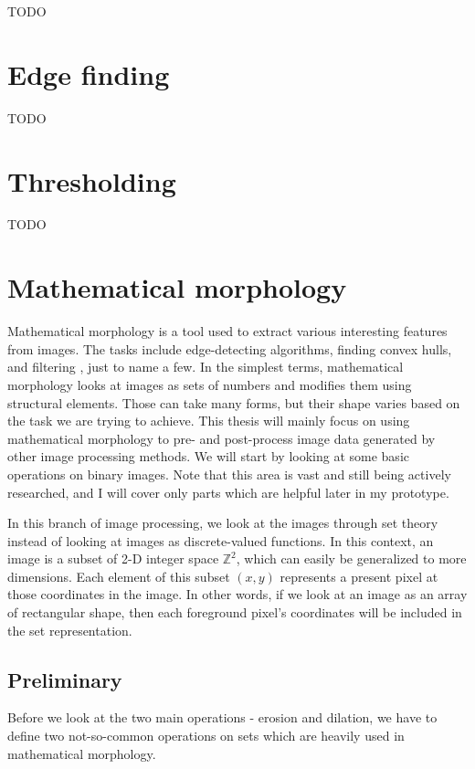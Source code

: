 \documentclass[
  digital,     %
  oneside,     %
  nosansbold,  %
  nocolorbold, %
  lof,         %
  lot,         %
]{fithesis4}
\newcommand*{\Z}{\ensuremath{\mathbb{Z}}}
\begin{document}
TODO

\section{Edge finding}
TODO

\section{Thresholding}
TODO

\section{Mathematical morphology}

Mathematical morphology is a tool used to extract various interesting features
from images. The tasks include edge-detecting algorithms, finding convex hulls, and filtering 
, just to name a few. In the simplest terms,
mathematical morphology looks at images as sets of numbers and modifies them using structural elements. Those can take many forms, but their shape varies based on the task we are trying
to achieve. This thesis will mainly focus on using mathematical morphology
to pre- and post-process image data generated by other image processing methods.
We will start by looking at some basic operations on binary images. Note that
this area is vast and still being actively researched, and I will cover only parts which are helpful later in my
prototype.

In this branch of image processing, we look at the images through set theory
instead of looking at images as discrete-valued functions. In this context, an
image is a subset of 2-D integer space $\Z^2$, which can easily be generalized
to more dimensions. Each element of this subset $(x, y)$ represents a present
pixel at those coordinates in the image. In other words, if we look at an image
as an array of rectangular shape, then each foreground pixel's coordinates will
be included in the set representation.

\subsection{Preliminary}
Before we look at the two main operations - erosion and dilation, we have to
define two not-so-common operations on sets which are heavily used in
mathematical morphology.
\end{document}
